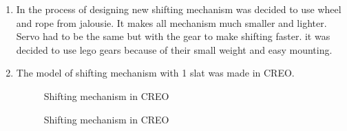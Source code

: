 \begin{enumerate}
 \item In the process of designing new shifting mechanism was decided to use wheel and rope from jalousie. It makes all mechanism much smaller and lighter. Servo had to be the same but with the gear to make shifting faster. it was decided to use lego gears because of their small weight and easy mounting.   
  
   \item The model of shifting mechanism with 1 slat was made in CREO. 
   \begin{figure}[H]
     \begin{minipage}[h]{0.49\linewidth}
 		\caption{Shifting mechanism in CREO}
 	 \end{minipage} 
 	 \begin{minipage}[h]{0.49\linewidth}
 		\caption{Shifting mechanism in CREO}
 	 \end{minipage}
   \end{figure}
   

\end{enumerate}
